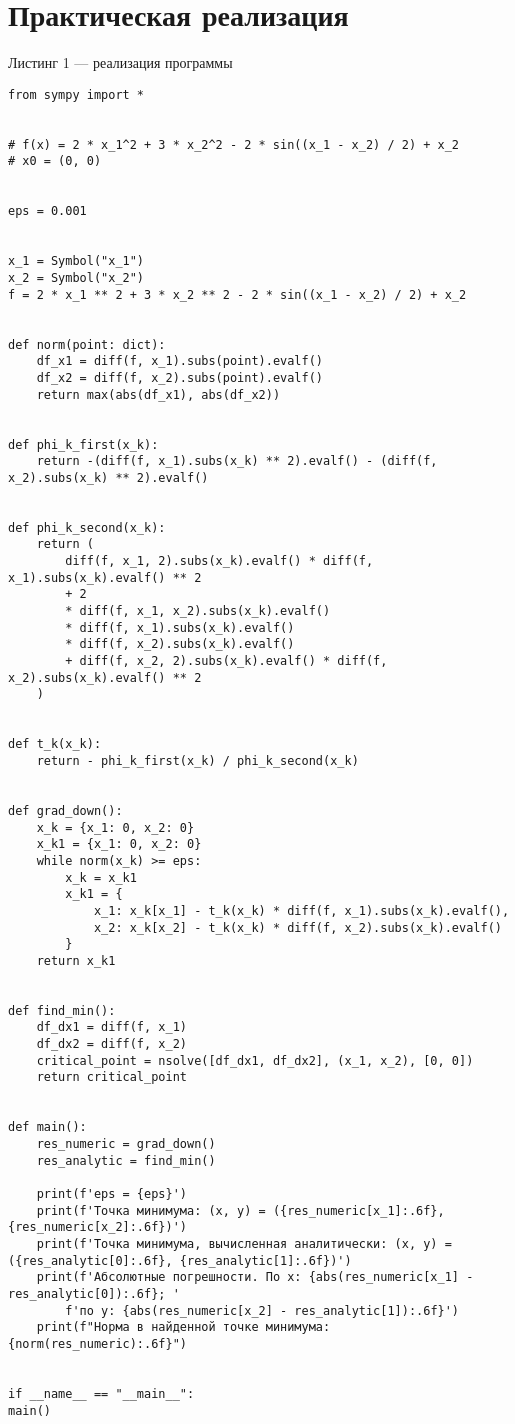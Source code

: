 \documentclass[a4paper, 14pt]{extarticle}
\begin{document}
\section{Практическая реализация}
Листинг 1 — реализация программы
\begin{verbatim}
from sympy import *


# f(x) = 2 * x_1^2 + 3 * x_2^2 - 2 * sin((x_1 - x_2) / 2) + x_2
# x0 = (0, 0)


eps = 0.001


x_1 = Symbol("x_1")
x_2 = Symbol("x_2")
f = 2 * x_1 ** 2 + 3 * x_2 ** 2 - 2 * sin((x_1 - x_2) / 2) + x_2


def norm(point: dict):
	df_x1 = diff(f, x_1).subs(point).evalf()
	df_x2 = diff(f, x_2).subs(point).evalf()
	return max(abs(df_x1), abs(df_x2))


def phi_k_first(x_k):
	return -(diff(f, x_1).subs(x_k) ** 2).evalf() - (diff(f, x_2).subs(x_k) ** 2).evalf()


def phi_k_second(x_k):
	return (
		diff(f, x_1, 2).subs(x_k).evalf() * diff(f, x_1).subs(x_k).evalf() ** 2
		+ 2
		* diff(f, x_1, x_2).subs(x_k).evalf()
		* diff(f, x_1).subs(x_k).evalf()
		* diff(f, x_2).subs(x_k).evalf()
		+ diff(f, x_2, 2).subs(x_k).evalf() * diff(f, x_2).subs(x_k).evalf() ** 2
	)


def t_k(x_k):
	return - phi_k_first(x_k) / phi_k_second(x_k)


def grad_down():
	x_k = {x_1: 0, x_2: 0}
	x_k1 = {x_1: 0, x_2: 0}
	while norm(x_k) >= eps:
		x_k = x_k1
		x_k1 = {
			x_1: x_k[x_1] - t_k(x_k) * diff(f, x_1).subs(x_k).evalf(),
			x_2: x_k[x_2] - t_k(x_k) * diff(f, x_2).subs(x_k).evalf()
		}
	return x_k1


def find_min():
	df_dx1 = diff(f, x_1)
	df_dx2 = diff(f, x_2)
	critical_point = nsolve([df_dx1, df_dx2], (x_1, x_2), [0, 0])
	return critical_point


def main():
	res_numeric = grad_down()
	res_analytic = find_min()
	
	print(f'eps = {eps}')
	print(f'Точка минимума: (x, y) = ({res_numeric[x_1]:.6f}, {res_numeric[x_2]:.6f})')
	print(f'Точка минимума, вычисленная аналитически: (x, y) = ({res_analytic[0]:.6f}, {res_analytic[1]:.6f})')
	print(f'Абсолютные погрешности. По x: {abs(res_numeric[x_1] - res_analytic[0]):.6f}; '
		f'по y: {abs(res_numeric[x_2] - res_analytic[1]):.6f}')
	print(f"Норма в найденной точке минимума: {norm(res_numeric):.6f}")


if __name__ == "__main__":
main()


\end{verbatim}
\end{document}
